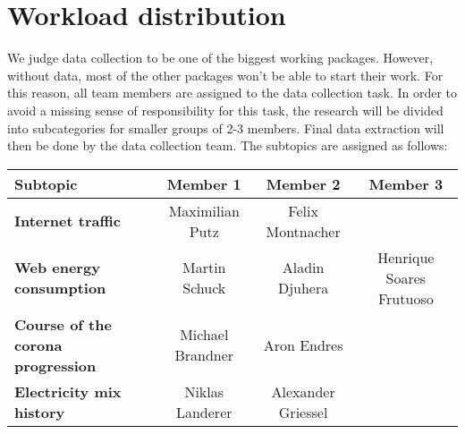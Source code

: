 \documentclass[s=english,inputenc=utf8,fontsize=10pt]{ldvarticle}
\begin{document}
\section{Workload distribution}

We judge data collection to be one of the biggest working packages. However, without data, most of the other packages won't be able to start their work. For this reason, all team members are assigned to the data collection task. In order to avoid a missing sense of responsibility for this task, the research will be divided into subcategories for smaller groups of 2-3 members. Final data extraction will then be done by the data collection team.
The subtopics are assigned as follows:
\begin{table}[h]
	\begin{center}
		\begin{tabular}{l|ccc} %
			\textbf{Subtopic} & Member 1 & Member 2 & Member 3\\
			\hline
			\textbf{Internet traffic} & Maximilian Putz & Felix Montnacher &\\
			\textbf{Web energy consumption} & Martin Schuck & Aladin Djuhera & Henrique Soares Frutuoso\\
			\textbf{Course of the corona progression} & Michael Brandner & Aron Endres &\\
			\textbf{Electricity mix history} & Niklas Landerer & Alexander Griessel &\\
		\end{tabular}
	\end{center}
\end{table}
\end{document}
